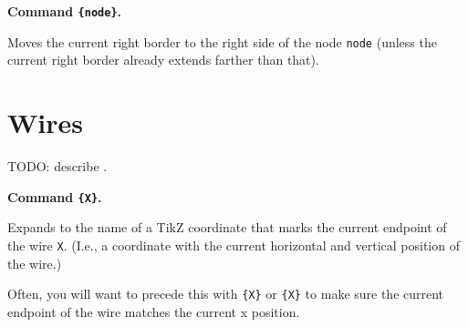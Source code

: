 \documentclass[a4paper]{article}
\makeatletter
\newenvironment{command}[2]{%
  \medskip\noindent\textbf{Command \macroanchor#1\texttt{#2}.} 
}{%
}
\newcommand\nobsstring[1]{{\escapechar=-1\xdef\@tempa{\string#1}}}
\DeclareRobustCommand\macrolink[1]{\nobsstring#1\hyperref[command-\@tempa]{\texttt{\string#1}}}
\DeclareRobustCommand\macroanchor[1]{\nobsstring#1\label{command-\@tempa}\texttt{\string#1}}
\makeatother
\begin{document}
\begin{command}\registerRightBorderCandidate{\{node\}}
  Moves the current right border to the right side of the node
  \texttt{node} (unless the current right border already extends
  farther than that).

\begin{example}
\end{example}
\end{command}



\section{Wires}
\label{sec:wires}

TODO: describe \macrolink\newWire.

\begin{command}\getWireCoord{\{X\}}
  Expands to the name of a TikZ coordinate that marks the current
  endpoint of the wire \texttt{X}. (I.e., a coordinate with the
  current horizontal and vertical position of the wire.)

  Often, you will want to precede this with
  \macrolink{\drawWires}\texttt{\{X\}} or
  \macrolink{\skipWires}\texttt{\{X\}} to make sure the current
  endpoint of the wire matches the current x position.

\begin{example}
\end{example}
\end{command}
\end{document}
